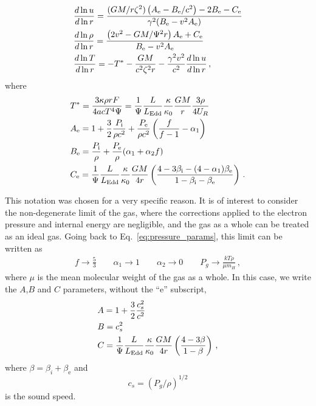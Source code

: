\documentclass[../main.tex]{subfiles}
\begin{document}
\begin{align}
    &\frac{d\ln u}{d\ln r}=\frac{(GM/r\zeta^2)\left(A_\text{e}-B_\text{e}/c^2\right)-2B_\text{e}-C_\text{e}}{\gamma^2(B_\text{e}-v^2A_\text{e})}\label{eq:dvdr}\\
    &\frac{d\ln\rho}{d\ln r}=\frac{\left(2v^2-GM/\Psi^2r\right)A_\text{e}+C_\text{e}}{B_\text{e}-v^2A_\text{e}} \label{eq:drhodr}\\
    &\frac{d\ln T}{d\ln r}=-T^*-\frac{GM}{c^2\zeta^2r}-\frac{\gamma^2v^2}{c^2}\frac{d\ln u}{d\ln r}\label{eq:dTdr}\,,
\end{align}
where
\begin{align}
    \label{eq:AeBeCe_constants}
    &T^*=\frac{3\kappa\rho rF}{4acT^4\Psi}=\frac{1}{\Psi}\frac{L}{L_\text{Edd}}\frac{\kappa}{\kappa_0}\frac{GM}{r}\frac{3\rho}{4U_R}\nonumber\\
    &A_\text{e}=1+\frac{3}{2}\frac{P_\text{i}}{\rho c^2}+\frac{P_\text{e}}{\rho c^2}\left(\frac{f}{f-1}-\alpha_1\right) \nonumber\\
    &B_\text{e}=\frac{P_\text{i}}{\rho}+\frac{P_\text{e}}{\rho}(\alpha_1+\alpha_2f) \nonumber \\
    &C_\text{e}=\frac{1}{\Psi}\frac{L}{L_\text{Edd}}\frac{\kappa}{\kappa_0}\frac{GM}{4r}\left(\frac{4-3\beta_\text{i}-(4-\alpha_1)\beta_\text{e}}{1-\beta_\text{i}-\beta_\text{e}}\right)\,.
\end{align}

This notation was chosen for a very specific reason. It is of interest to consider the non-degenerate limit of the gas, where the corrections applied to the electron pressure and internal energy are negligible, and the gas as a whole can be treated as an ideal gas. Going back to Eq.~\eqref{eq:pressure_params}, this limit can be written as
\begin{gather}
    f\rightarrow \frac{5}{3} \qquad \alpha_1\rightarrow 1 \qquad \alpha_2\rightarrow 0 \qquad P_g\rightarrow\frac{kT\rho}{\mu m_H} \,,
\end{gather}
where $\mu$ is the mean molecular weight of the gas as a whole. In this case, we write the $A$,$B$ and $C$ parameters, without the ``e'' subscript,
\begin{align}
    \label{eq:ABC_constants}
    &A=1+\frac{3}{2}\frac{c_s^2}{c^2} \nonumber\\
    &B=c_s^2 \nonumber \\
    &C=\frac{1}{\Psi}\frac{L}{L_\text{Edd}}\frac{\kappa}{\kappa_0}\frac{GM}{4r}\left(\frac{4-3\beta}{1-\beta}\right)\,,
\end{align}
where $\beta=\beta_i+\beta_\text{e}$ and
\begin{equation}\label{eq:cs}
    c_s=(P_g/\rho)^{1/2}
\end{equation}
is the sound speed. 
\end{document}
